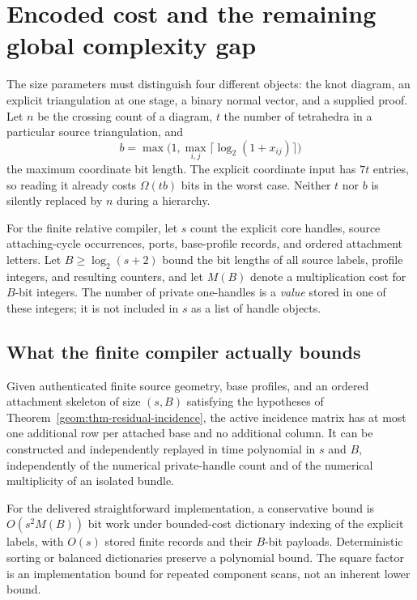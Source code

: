 \section{Encoded cost and the remaining global complexity gap}
\label{sec:complexity}

The size parameters must distinguish four different objects: the knot
diagram, an explicit triangulation at one stage, a binary normal vector,
and a supplied proof.  Let $n$ be the crossing count of a diagram, $t$ the
number of tetrahedra in a particular source triangulation, and
\[
 b=\max\bigl(1,\max_{i,j}\lceil\log_2(1+x_{ij})\rceil\bigr)
\]
the maximum coordinate bit length.  The explicit coordinate input has
$7t$ entries, so reading it already costs $\Omega(tb)$ bits in the worst
case.  Neither $t$ nor $b$ is silently replaced by $n$ during a hierarchy.

For the finite relative compiler, let $s$ count the explicit core handles,
source attaching-cycle occurrences, ports, base-profile records, and
ordered attachment letters.  Let $B\geq\log_2(s+2)$ bound the bit lengths
of all source labels, profile integers, and resulting counters, and let
$M(B)$ denote a multiplication cost for $B$-bit integers.  The number of
private one-handles is a \emph{value} stored in one of these integers; it
is not included in $s$ as a list of handle objects.

\subsection{What the finite compiler actually bounds}

\begin{proposition}
\label{prop:finite-cost}
Given authenticated finite source geometry, base profiles, and an ordered
attachment skeleton of size $(s,B)$ satisfying the hypotheses of
Theorem~\ref{geom:thm-residual-incidence}, the active incidence matrix has
at most one additional row per attached base and no additional column.
It can be constructed and independently replayed in time polynomial in
$s$ and $B$, independently of the numerical private-handle count and of
the numerical multiplicity of an isolated bundle.

For the delivered straightforward implementation, a conservative bound
is $O(s^2M(B))$ bit work under bounded-cost dictionary indexing of the
explicit labels, with $O(s)$ stored finite records and their $B$-bit
payloads.  Deterministic sorting or balanced dictionaries preserve a
polynomial bound.  The square factor is an implementation bound for
repeated component scans, not an inherent lower bound.
\end{proposition}

